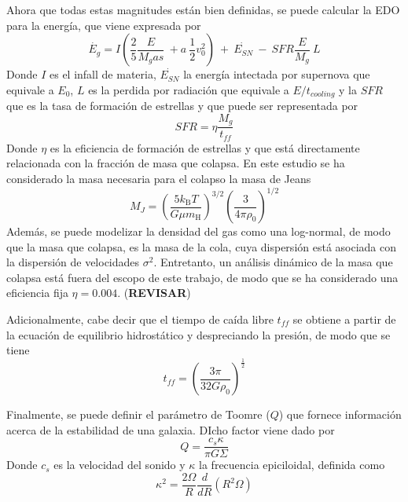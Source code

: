 Ahora que todas estas magnitudes están bien definidas, se puede calcular la EDO para la energía, que viene expresada por 
\begin{equation}
	\dot{E_g} = I\left(\frac{2}{5}\frac{E}{M_gas} \ + a \ \frac{1}{2} v_0^2\right) \ + \ \dot{E_{SN}} \ - \ SFR\frac{E}{M_g} \ L
\end{equation}
Donde $I$ es el infall de materia, $\dot{E_{SN}} $ la energía intectada por supernova que equivale a $E_0$, $L$ es la perdida por radiación que equivale a $E/t_{cooling}$ y la $SFR$ que es la tasa de formación de estrellas y que puede ser representada por 
\begin{equation}
	SFR = \eta \frac{M_g}{t_{ff}}
\end{equation}
Donde $\eta$ es la eficiencia de formación de estrellas y que está directamente relacionada con la fracción de masa que colapsa. En este estudio se ha considerado la masa necesaria para el colapso la masa de Jeans
\begin{equation}
    M_J = \left( \frac{5 k_\text{B} T}{G \mu m_\text{H}} \right)^{3/2} \left( \frac{3}{4\pi \rho_0} \right)^{1/2}
\end{equation}
Además, se puede modelizar la densidad del gas como una log-normal, de modo que la masa que colapsa, es la masa de la cola, cuya dispersión está asociada con la dispersión de velocidades $\sigma^2$. Entretanto, un análisis dinámico de la masa que colapsa está fuera del escopo de este trabajo, de modo que se ha considerado una eficiencia fija $\eta = 0.004$. (\textbf{REVISAR})

Adicionalmente, cabe decir que el tiempo de caída libre $t_{ff}$ se obtiene a partir de la ecuación de equilibrio hidrostático y despreciando la presión, de modo que se tiene
\begin{equation}
	t_{ff} = \left(\frac{3\pi}{32G\rho_0}\right)^\frac{1}{2}
\end{equation}

Finalmente, se puede definir el parámetro de Toomre ($Q$) que fornece información acerca de la estabilidad de una galaxia. DIcho factor viene dado por
\begin{equation}
	Q = \frac{c_s \kappa}{\pi G \Sigma}
\end{equation}
Donde $c_s$ es la velocidad del sonido y $\kappa$ la frecuencia epiciloidal, definida como
\begin{equation}
	\kappa^2 = \frac{2\Omega}{R} \frac{d}{dR}\left(R^2\Omega\right)
\end{equation}

